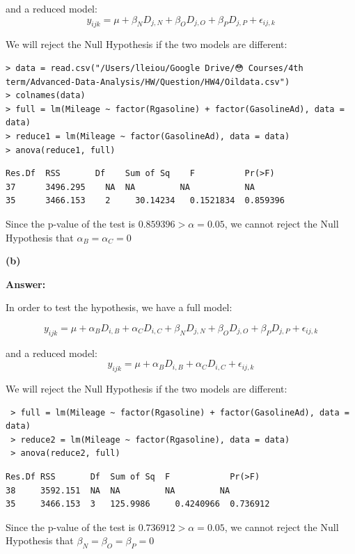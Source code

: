 \documentclass[letterpaper,11pt]{article}
\begin{document}
and a reduced model:
$$y_{ijk} = \mu + \beta_ND_{j,N} + \beta_OD_{j,O} + \beta_PD_{j,P} + \epsilon_{ij,k}$$

We will reject the Null Hypothesis if the two models are different:
\begin{lstlisting}
> data = read.csv("/Users/lleiou/Google Drive/😳 Courses/4th term/Advanced-Data-Analysis/HW/Question/HW4/Oildata.csv")
> colnames(data)
> full = lm(Mileage ~ factor(Rgasoline) + factor(GasolineAd), data = data)
> reduce1 = lm(Mileage ~ factor(GasolineAd), data = data)
> anova(reduce1, full)
\end{lstlisting}

\begin{lstlisting}
Res.Df	RSS	      Df	Sum of Sq	 F	        Pr(>F)
37	    3496.295	NA	NA	       NA	        NA
35	    3466.153	2	  30.14234	 0.1521834	0.859396
\end{lstlisting}

Since the p-value of the test is $0.859396 > \alpha = 0.05$, we cannot reject the Null Hypothesis that $\alpha_B = \alpha_C = 0$


\begin{addmargin}[-1.1em]{0em}
  \textbf{(b)}\par
\end{addmargin}
\textbf{}\par
\bigbreak
\begin{addmargin}[-0.5em]{0em}
  \textbf{Answer: }
\end{addmargin}

 In order to test the hypothesis, we have a full model:

 $$y_{ijk} = \mu + \alpha_BD_{i,B} + \alpha_CD_{i,C} + \beta_ND_{j,N} + \beta_OD_{j,O} + \beta_PD_{j,P} + \epsilon_{ij,k}$$

 and a reduced model:
 $$y_{ijk} = \mu + \alpha_BD_{i,B} + \alpha_CD_{i,C} + \epsilon_{ij,k}$$

 We will reject the Null Hypothesis if the two models are different:
\begin{lstlisting}
 > full = lm(Mileage ~ factor(Rgasoline) + factor(GasolineAd), data = data)
 > reduce2 = lm(Mileage ~ factor(Rgasoline), data = data)
 > anova(reduce2, full)
\end{lstlisting}

\begin{lstlisting}
Res.Df RSS	     Df	 Sum of Sq	F	         Pr(>F)
38	   3592.151	 NA	 NA	        NA	       NA
35	   3466.153	 3	 125.9986	  0.4240966	 0.736912
\end{lstlisting}

Since the p-value of the test is $0.736912 > \alpha = 0.05$, we cannot reject the Null Hypothesis that $\beta_N = \beta_O =\beta_P = 0$
\end{document}
